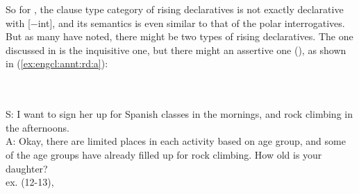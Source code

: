 So for \textcite{farkasroelofsen2017}, the clause type category of rising declaratives is not exactly declarative with [$-$int], and its semantics is even similar to that of the polar interrogatives. But as many have noted, there might be two types of rising declaratives. The one discussed in \textcite{farkasroelofsen2017} is the inquisitive one, but there might an assertive one (\cite{jeong2018, goodhue2021rd}), as shown in (\ref{ex:engcl:annt:rd:a}):

\bxl
\label{ex:engcl:annt:rd:q}
\\
\ex
\label{ex:engcl:annt:rd:a}
\\
S: I want to sign her up for Spanish classes in the mornings, and rock climbing in the afternoons.\\
A: Okay, there are limited places in each activity based on age group, and some of the age groups have already filled up for rock climbing. How old is your daughter?\\
\exl
\hspace*{\fill}\hfill ex. (12-13), \cite[p.955]{goodhue2021rd}
\eex

